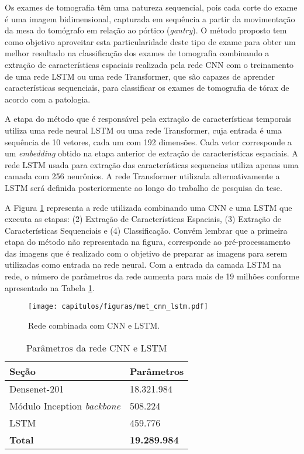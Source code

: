 Os exames de tomografia têm uma natureza sequencial, pois cada corte do exame é uma imagem bidimensional, capturada em sequência a partir da movimentação da mesa do tomógrafo em relação ao pórtico (\textit{gantry}). O método proposto tem como objetivo aproveitar esta particularidade deste tipo de exame para obter um melhor resultado na classificação dos exames de tomografia combinando a extração de características espaciais realizada pela rede CNN com o treinamento de uma rede LSTM ou uma rede Transformer, que são capazes de aprender características sequenciais, para classificar os exames de tomografia de tórax de acordo com a patologia.

A etapa do método que é responsável pela extração de características temporais utiliza uma rede neural LSTM ou uma rede Transformer, cuja entrada é uma sequência de 10 vetores, cada um com 192 dimensões. Cada vetor corresponde a um \textit{embedding} obtido na etapa anterior de extração de características espaciais. A rede LSTM usada para extração das características sequencias utiliza apenas uma camada com 256 neurônios. A rede Transformer utilizada alternativamente a LSTM será definida posteriormente ao longo do trabalho de pesquisa da tese.

A Figura \ref{fig:met_rede_cnn_lstm} representa a rede utilizada combinando uma CNN e uma LSTM que executa as etapas: (2) Extração de Características Espaciais, (3) Extração de Características Sequenciais e (4) Classificação. Convém lembrar que a primeira etapa do método não representada na figura, corresponde ao pré-processamento das imagens que é realizado com o objetivo de preparar as imagens para serem utilizadas como entrada na rede neural. Com a entrada da camada LSTM na rede, o número de parâmetros da rede aumenta para mais de 19 milhões conforme apresentado na Tabela \ref{table:met_pesos_cnn_lstm}.

\begin{figure}[!ht]
\centering
\texttt{[image: capitulos/figuras/met\_cnn\_lstm.pdf]}
\caption{Rede combinada com CNN e LSTM.}
\label{fig:met_rede_cnn_lstm}
\end{figure}

\begin{table}[]
\centering
\caption{Parâmetros da rede CNN e LSTM}
\label{table:met_pesos_cnn_lstm}
\begin{tabular}{@{}ll@{}}
\toprule
Seção                                               & Parâmetros          \\ \midrule
Densenet-201                                        & 18.321.984          \\
Módulo Inception \textit{backbone}                  & 508.224             \\
LSTM                                                & 459.776             \\
\textbf{Total}                                      & \textbf{19.289.984} \\ \bottomrule
\end{tabular}
\end{table}


